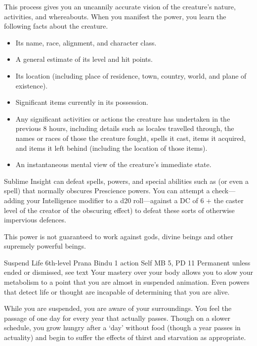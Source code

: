 This process gives you an uncannily accurate vision
of the creature's nature,
activities,
and whereabouts.
When you manifest the power,
you learn the following facts about the creature.
\begin{itemize}
  \item Its name, race, alignment, and character class.
  \item A general estimate of its level and hit points.
  \item Its location (including place of residence, town,
        country, world, and plane of existence).
  \item Significant items currently in its possession.
  \item Any significant activities or actions the creature
        has undertaken in the previous 8 hours,
        including details such as locales travelled through,
        the names or races of those the creature fought,
        spells it cast,
        items it acquired,
        and items it left behind
        (including the location of those items).
  \item An instantaneous mental view of the creature's
        immediate state.
\end{itemize}

Sublime Insight can defeat spells,
powers,
and special abilities such as 
(or even a  spell)
that normally obscures Prescience powers.
You can attempt a check---adding your
Intelligence modifier to a d20 roll---against
a DC of 6 + the caster level of the
creator of the obscuring effect)
to defeat these sorts of otherwise impervious defences.

This power is not guaranteed to work against gods, divine beings
and other supremely powerful beings.

\DndPowerHeader%
    {Suspend Life\label{pwr:suspend_life}}
    {6th-level Prana Bindu}
    {1 action}
    {Self}
    {MB 5, PD 11}
    {Permanent unless ended or dismissed, see text}
Your mastery over your body allows you to
slow your metabolism to a point that you are almost in suspended
animation. Even powers that detect life or thought are incapable
of determining that you are alive.

While you are suspended, you are aware of your surroundings.
You feel the passage of one day for every year that actually
passes. Though on a slower schedule, you grow hungry after
a `day' without food (though a year passes in actuality)
and begin to suffer the effects of thirst and starvation as
appropriate.

